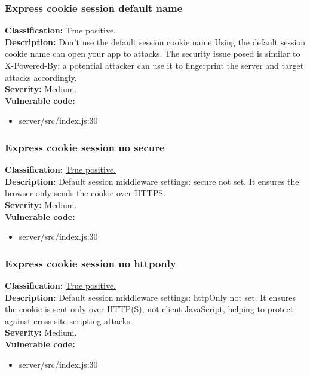 \documentclass[]{article}
\begin{document}
\subsubsection{Express cookie session default name}
\textbf{Classification:} True positive. \\ 
\textbf{Description:} Don't use the default session cookie name Using the default session cookie name can open your 
app to attacks. The security issue posed is similar to X-Powered-By: a potential attacker can use it to fingerprint 
the server and target attacks accordingly. \\ 
\textbf{Severity:} Medium. \\ 
\textbf{Vulnerable code:} 
\begin{itemize}
    \item server/src/index.js:30
\end{itemize}

\subsubsection{Express cookie session no secure}
\textbf{Classification:} \hyperref[subsubsec:sensitive_cookie_without_secure_and_httponly_attributes]{True positive.} \\ 
\textbf{Description:} Default session middleware settings: secure not set. It ensures the browser only
 sends the cookie over HTTPS. \\ 
\textbf{Severity:} Medium. \\ 
\textbf{Vulnerable code:} 
\begin{itemize}
    \item server/src/index.js:30
\end{itemize}

\subsubsection{Express cookie session no httponly}
\textbf{Classification:} \hyperref[subsubsec:cross_site_scripting]{True positive.} \\ 
\textbf{Description:} Default session middleware settings: httpOnly not set. It ensures the cookie is sent 
only over HTTP(S), not client JavaScript, helping to protect against cross-site scripting attacks. \\ 
\textbf{Severity:} Medium. \\ 
\textbf{Vulnerable code:} 
\begin{itemize}
    \item server/src/index.js:30
\end{itemize}
\end{document}
